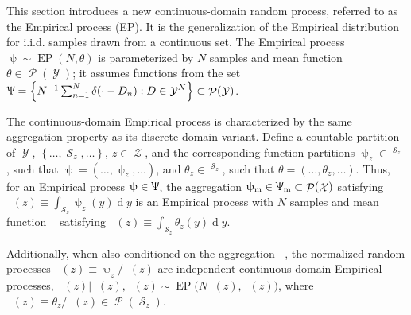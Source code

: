 \documentclass[12pt]{report}
\DeclareMathOperator{\drm}{\mathrm{d}}
\DeclareMathOperator{\Xcal}{\mathcal{X}}
\DeclareMathOperator{\Ycal}{\mathcal{Y}}
\DeclareMathOperator{\Zcal}{\mathcal{Z}}
\DeclareMathOperator{\Scal}{\mathcal{S}}
\DeclareMathOperator{\Pcal}{\mathcal{P}}
\DeclareMathOperator{\Rbbgeq}{\mathbb{R}_{\geq 0}}
\DeclareMathOperator{\EP}{\mathrm{EP}}
\DeclareMathOperator{\thetam}{\theta_\text{m}}
\DeclareMathOperator{\thetac}{\theta_\text{c}}
\DeclareMathOperator{\upthetac}{\uptheta_\text{c}}
\DeclareMathOperator{\uppsim}{\uppsi_\text{m}}
\DeclareMathOperator{\Uppsim}{\Uppsi_\text{m}}
\DeclareMathOperator{\uppsic}{\uppsi_\text{c}}
\begin{document}
This section introduces a new continuous-domain random process, referred to as the Empirical process (EP). It is the generalization of the Empirical distribution for i.i.d. samples drawn from a continuous set. The Empirical process $\uppsi \sim \EP(N,\theta)$ is parameterized by $N$ samples and mean function $\theta \in \Pcal(\Ycal)$; it assumes functions from the set $\Uppsi = \left\{ N^{-1} \sum_{n=1}^N \delta(\cdot - D_n) : D \in \Ycal^N \right\} \subset \Pcal(\Ycal)$.

The continuous-domain Empirical process is characterized by the same aggregation property as its discrete-domain variant. Define a countable partition of $\Ycal$, $\left\{ \ldots,\Scal_z,\ldots \right\}$, $z \in \Zcal$, and the corresponding function partitions $\uppsi_z \in \Rbbgeq^{\Scal_z}$, such that $\uppsi = \left( \ldots,\uppsi_z,\ldots \right)$, and $\theta_z \in \Rbbgeq^{\Scal_z}$, such that $\theta = \left( \ldots,\theta_z,\ldots \right)$. Thus, for an Empirical process $\uppsi \in \Uppsi$, the aggregation $\uppsim \in \Uppsim \subset \Pcal(\Xcal)$ satisfying $\uppsim(z) \equiv \int_{\Scal_z} \uppsi_z(y) {\drm}y$ is an Empirical process with $N$ samples and mean function $\thetam$ satisfying $\thetam(z) \equiv \int_{\Scal_z} \theta_z(y) {\drm}y$.

Additionally, when also conditioned on the aggregation $\uppsim$, the normalized random processes $\uppsic(z) \equiv \uppsi_z / \uppsim(z)$ are independent continuous-domain Empirical processes, $\uppsic(z) | \uppsim(z), \upthetac(z) \sim \EP\big(N \uppsim(z), \upthetac(z)\big)$, where $\thetac(z) \equiv \theta_z / \thetam(z) \in \Pcal(\Scal_z)$.
\end{document}
